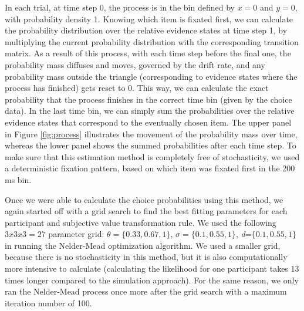 \documentclass[11pt,a4paper]{article}
\begin{document}
In each trial, at time step 0, the process is in the bin defined by $x = 0$ and $y = 0$, with probability density 1. Knowing which item is fixated first, we can calculate the probability distribution over the relative evidence states at time step 1, by multiplying the current probability distribution with the corresponding transition matrix. As a result of this process, with each time step before the final one, the probability mass diffuses and moves, governed by the drift rate, and any probability mass outside the triangle (corresponding to evidence states where the process has finished) gets reset to 0. This way, we can calculate the exact probability that the process finishes in the correct time bin (given by the choice data). In the last time bin, we can simply sum the probabilities over the relative evidence states that correspond to the eventually chosen item. The upper panel in Figure \ref{fig:process} illustrates the movement of the probability mass over time, whereas the lower panel shows the summed probabilities after each time step. To make sure that this estimation method is completely free of stochasticity, we used a deterministic fixation pattern, based on which item was fixated first in the 200 ms bin. 

Once we were able to calculate the choice probabilities using this method, we again started off with a grid search to find the best fitting parameters for each participant and subjective value transformation rule. We used the following $3x3x3=27$ parameter grid: $\theta=\{0.33, 0.67, 1\}$, $\sigma=\{0.1, 0.55, 1\}$, \textit{d}=$\{0.1, 0.55, 1\}$ in running the Nelder-Mead optimization algorithm. We used a smaller grid, because there is no stochasticity in this method, but it is also computationally more intensive to calculate (calculating the likelihood for one participant takes 13 times longer compared to the simulation approach). For the same reason, we only ran the Nelder-Mead process once more after the grid search with a maximum iteration number of 100.  
\end{document}
